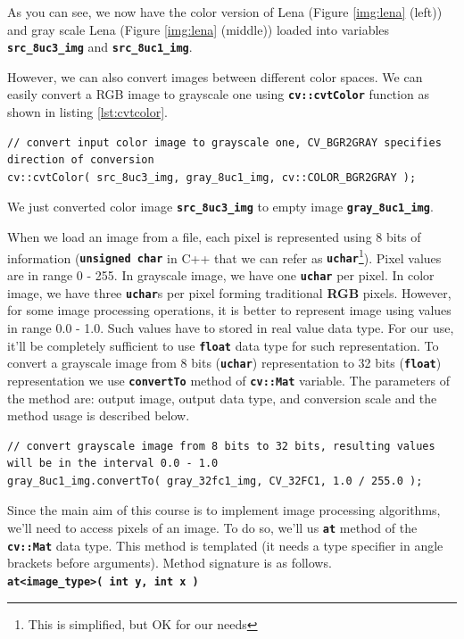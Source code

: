 \documentclass[10pt]{article}
\newcommand{\code}[1]{\textbf{\texttt{#1}}}
\begin{document}
As you can see, we now have the color version of Lena (Figure \ref{img:lena} (left)) and gray scale Lena (Figure \ref{img:lena} (middle))
loaded into variables \code{src\_8uc3\_img} and \code{src\_8uc1\_img}.

However, we can also convert images between different color spaces.
We can easily convert a RGB image to grayscale one using \code{cv::cvtColor}
function as shown in listing \ref{lst:cvtcolor}.

\begin{lstlisting}[style=CStyle,caption={Converting a color image to a grascale one.},label={lst:cvtcolor}]
// convert input color image to grayscale one, CV_BGR2GRAY specifies direction of conversion
cv::cvtColor( src_8uc3_img, gray_8uc1_img, cv::COLOR_BGR2GRAY );
\end{lstlisting}

We just converted color image \code{src\_8uc3\_img} to empty image \code{gray\_8uc1\_img}.

When we load an image from a file, each pixel is represented using 8 bits of information (\code{unsigned char} in C++ that we can refer as
\code{uchar}\footnote{This is simplified, but OK for our needs}). Pixel values are in range 0 - 255. In grayscale image, we have one \code{uchar} per pixel.
In color image, we have three \code{uchar}s per pixel forming traditional \textbf{RGB} pixels.
However, for some image processing operations, it is better to represent image using values in range 0.0 - 1.0.
Such values have to stored in real value data type. For our use, it'll be completely sufficient to use \code{float} data type for such representation.
To convert a grayscale image from 8 bits (\code{uchar}) representation to 32 bits (\code{float}) representation we use \code{convertTo} method of \code{cv::Mat} variable.
The parameters of the method are: output image, output data type, and conversion scale and the method usage is described below.

\begin{lstlisting}[style=CStyle,caption={Converting an image represented using \code{uchar}s to an image represented by \code{float}s.},label={lst:convertto}]
// convert grayscale image from 8 bits to 32 bits, resulting values will be in the interval 0.0 - 1.0
gray_8uc1_img.convertTo( gray_32fc1_img, CV_32FC1, 1.0 / 255.0 );
\end{lstlisting}

Since the main aim of this course is to implement image processing algorithms, we'll need to access pixels of an image.
To do so, we'll us \code{at} method of the \code{cv::Mat} data type.
This method is templated (it needs a type specifier in angle brackets before arguments). Method signature is as follows.
\\
\code{at<image\_type>( int y, int x )}
\end{document}
